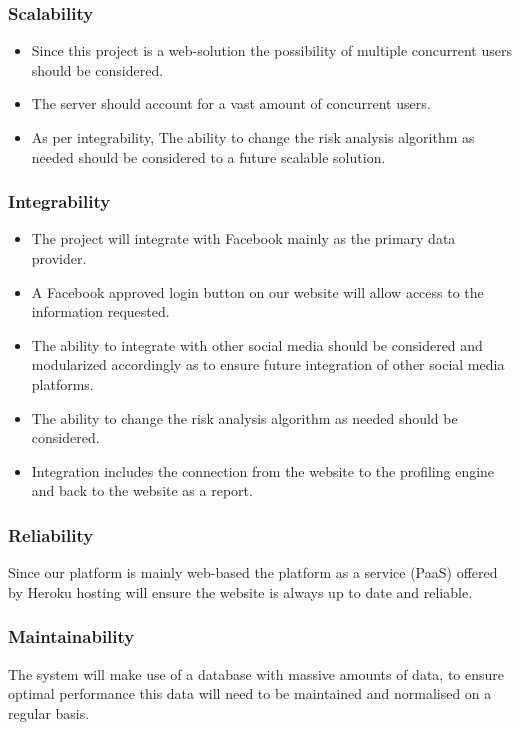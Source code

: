 \documentclass{article}
\begin{document}
		\subsubsection{Scalability}
		\begin{itemize}
			\item Since this project is a web-solution the possibility of multiple concurrent users should be considered.
			\item The server should account for a vast amount of concurrent users.
			\item As per integrability, The ability to change the risk analysis algorithm as needed should be considered to a future scalable solution.
		\end{itemize}

		
		\subsubsection{Integrability}
		\begin{itemize}
			\item The project will integrate with Facebook mainly as the primary data provider.
			\item A Facebook approved login button on our website will allow access to the information requested. 
			\item The ability to integrate with other social media should be considered and modularized accordingly as to ensure future integration of other social media platforms. 
		\item The ability to change the risk analysis algorithm as needed should be considered.
		\item Integration includes the connection from the website to the profiling engine and back to the website as a report.
		\end{itemize}		
		\subsubsection{Reliability}
		Since our platform is mainly web-based the platform as a service (PaaS) offered by Heroku hosting will ensure the website is always up to date and reliable.
		\subsubsection{Maintainability}
		The system will make use of a database with massive amounts of data, to ensure optimal performance this data will need to be maintained and normalised on a regular basis.
\end{document}

